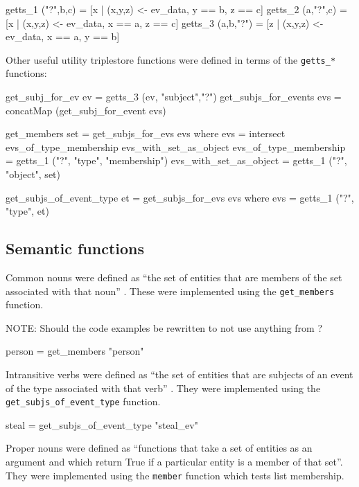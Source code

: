 \documentclass[../main.tex]{subfiles}
\begin{document}
\begin{code}
	getts_1 ("?",b,c)   = [x | (x,y,z) <- ev_data, y == b, z == c]
	getts_2 (a,"?",c)   = [x | (x,y,z) <- ev_data, x == a, z == c]
	getts_3 (a,b,"?")   = [z | (x,y,z) <- ev_data, x == a, y == b]
\end{code}

Other useful utility triplestore functions were defined in terms of the \texttt{getts\_*}
functions:

\begin{code}
	get_subj_for_ev ev       = getts_3 (ev,  "subject","?")
	get_subjs_for_events evs = concatMap (get_subj_for_event evs)
	
	get_members set = get_subjs_for_evs evs
	where
		evs = intersect evs_of_type_membership evs_with_set_as_object
		evs_of_type_membership   = getts_1 ("?", "type", "membership")
		evs_with_set_as_object   = getts_1 ("?",  "object",  set)
		
	get_subjs_of_event_type et  = get_subjs_for_evs evs
	where
		evs = getts_1 ("?",  "type",  et)
\end{code}

\subsection{Semantic functions}

Common nouns were defined as ``the set of entities that are members of the set associated with that noun'' \cite{frost2014denotational}.
These were implemented using the \texttt{get\_members} function.

NOTE: Should the code examples be rewritten to not use anything from \cite{frost2014denotational}?
\begin{code}
	person = get_members "person"
\end{code}

Intransitive verbs were defined as ``the set of entities that are subjects of an event of the type associated with that verb'' \cite{frost2014denotational}.
They were implemented using the \texttt{get\_subjs\_of\_event\_type} function.

\begin{code}
	steal = get_subjs_of_event_type "steal_ev"
\end{code}

Proper nouns were defined as ``functions that take a set of entities as an
argument and which return True if a particular entity is a member of that
set''\cite{frost2014denotational}.  They were implemented using the
\texttt{member} function which tests list membership.
\end{document}
